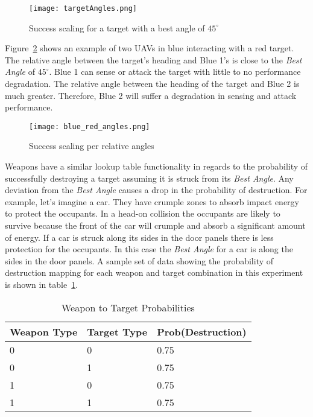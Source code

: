 
\begin{figure}[H]
	\centering
	\texttt{[image: targetAngles.png]}
	\caption{Success scaling for a target with a best angle of $45^{\circ}$}
	\label{fig:targetAngles}
\end{figure}

Figure~\ref{fig:blue_red_angles} shows an example of two UAVs in blue interacting with a red target.  The relative angle between the target's heading and Blue 1's is close to the \textit{Best Angle} of $45^{\circ}$.  Blue 1 can sense or attack the target with little to no performance degradation.  The relative angle between the heading of the target and Blue 2 is much greater.  Therefore, Blue 2 will suffer a degradation in sensing and attack performance.

\begin{figure}[H]
	\centering
	\texttt{[image: blue\_red\_angles.png]}
	\caption{Success scaling per relative angles}
	\label{fig:blue_red_angles}
\end{figure}


Weapons have a similar lookup table functionality in regards to the probability of successfully destroying a target assuming it is struck from its \textit{Best Angle}.  Any deviation from the \textit{Best Angle} causes a drop in the probability of destruction.  For example, let's imagine a car.  They have crumple zones to absorb impact energy to protect the occupants.  In a head-on collision the occupants are likely to survive because the front of the car will crumple and absorb a significant amount of energy.  If a car is struck along its sides in the door panels there is less protection for the occupants.  In this case the \textit{Best Angle} for a car is along the sides in the door panels. A sample set of data showing the probability of destruction mapping for each weapon and target combination in this experiment is shown in table~\ref{tab:wpnTgtProb}.

\begin{table}[H]
	\caption{Weapon to Target Probabilities}
	\centering
	\label{tab:wpnTgtProb}
	\begin{tabular}{|p{1.5cm}|p{1.5cm}|p{3cm}|}
		\hline
		Weapon Type & Target Type & Prob(Destruction)\\ \hline
		0 & 0 & 0.75 \\
		0 & 1 & 0.75 \\
		1 & 0 & 0.75 \\
		1 & 1 & 0.75 \\
		\hline
	\end{tabular}
\end{table}



